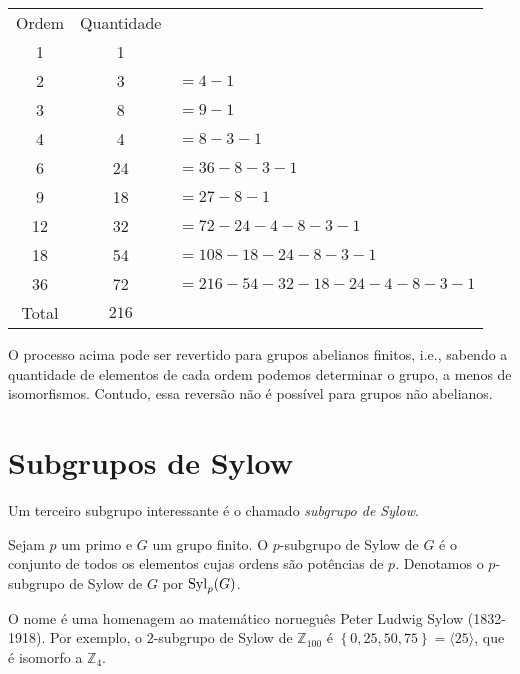     	\begin{center}
    		\begin{tabular}{|c|c|l}
    			\cline{1-2}
    			Ordem & Quantidade & \\
    			\cline{1-2}
    			1 & 1 & \\
    			\cline{1-2}
    			2 & 3 & $= 4 - 1$\\
    			\cline{1-2}
    			3 & 8 & $= 9 - 1$\\
    			\cline{1-2}
    			4 & 4 & $= 8 - 3 - 1$\\
    			\cline{1-2}
    			6 & 24 & $= 36 - 8 - 3 - 1$\\
    			\cline{1-2}
    			9 & 18 & $= 27 - 8 - 1$\\
    			\cline{1-2}
    			12 & 32 & $= 72 - 24 - 4 - 8 - 3 - 1$\\
    			\cline{1-2}
    			18 & 54 & $= 108 - 18 - 24 - 8 - 3 - 1$\\
    			\cline{1-2}
    			36 & 72 & $= 216 - 54 - 32 - 18 - 24 - 4 - 8 - 3 - 1$ \\
    			\cline{1-2}
    			Total & $216$ &  \\
    			\cline{1-2}
    		\end{tabular}
    	\end{center}
    	\par\vspace{0.3cm} O processo acima pode ser revertido para grupos abelianos finitos, i.e., 
    	sabendo a quantidade de elementos de cada ordem podemos determinar o grupo, a menos de isomorfismos.
    	Contudo, essa reversão não é possível para grupos não abelianos.
	\section{Subgrupos de Sylow} 
    	Um terceiro subgrupo interessante é o chamado \textit{subgrupo de Sylow}.
    	\begin{definition}
    	\label{def subgrupo de Sylow}
    		Sejam $p$ um primo e $G$ um grupo finito. O $p$-subgrupo de Sylow de $G$ é o conjunto de todos 
    		os elementos cujas ordens são potências de $p$. Denotamos o $p$-subgrupo de Sylow de $G$ por
    		$\operatorname{Syl}_p(G)$.
    	\end{definition}
    	\par\vspace{0.3cm} O nome é uma homenagem ao matemático norueguês Peter Ludwig Sylow (1832-1918). 
    	Por exemplo, o $2$-subgrupo de Sylow de $\mathbb{Z}_{100}$	é 
    	$\left\{ 0, 25, 50, 75 \right\} = \langle 25 \rangle$, que é isomorfo a $\mathbb{Z}_4$.
    	
